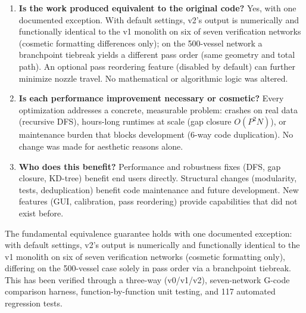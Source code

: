 \documentclass[11pt,a4paper]{article}
\begin{document}
\begin{enumerate}[leftmargin=2em]
    \item \textbf{Is the work produced equivalent to the original code?} Yes, with one documented exception. With default settings, v2's output is numerically and functionally identical to the v1 monolith on six of seven verification networks (cosmetic formatting differences only); on the 500-vessel network a branchpoint tiebreak yields a different pass order (same geometry and total path). An optional pass reordering feature (disabled by default) can further minimize nozzle travel. No mathematical or algorithmic logic was altered.

    \item \textbf{Is each performance improvement necessary or cosmetic?} Every optimization addresses a concrete, measurable problem: crashes on real data (recursive DFS), hours-long runtimes at scale (gap closure $O(P^2N)$), or maintenance burden that blocks development (6-way code duplication). No change was made for aesthetic reasons alone.

    \item \textbf{Who does this benefit?} Performance and robustness fixes (DFS, gap closure, KD-tree) benefit end users directly. Structural changes (modularity, tests, deduplication) benefit code maintenance and future development. New features (GUI, calibration, pass reordering) provide capabilities that did not exist before.
\end{enumerate}

The fundamental equivalence guarantee holds with one documented exception: with default settings, v2's output is numerically and functionally identical to the v1 monolith on six of seven verification networks (cosmetic formatting only), differing on the 500-vessel case solely in pass order via a branchpoint tiebreak. This has been verified through a three-way (v0/v1/v2), seven-network G-code comparison harness, function-by-function unit testing, and 117 automated regression tests.
\end{document}

